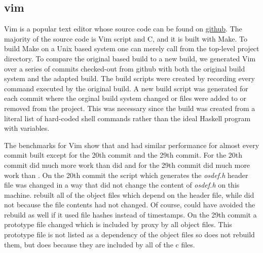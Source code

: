 \subsection{vim}
\label{sec:eval:vim}


Vim is a popular text editor whose source code can be found on \href{https://github.com/vim/vim}{github}.  The majority of the source code is Vim script and C, and it is built with Make.  To build Make on a Unix based system one can merely call \Make from the top-level project directory.  To compare the original \Make based build to a new \Rattle build, we generated Vim over a series of commits checked-out from github with both the original build system and the adapted \Rattle build.  The \Rattle build scripts were created by recording every command executed by the original build.
A new \Rattle build script was generated for each commit where the orginal build system changed or files were added to or removed from the project.  This was necessary since the \Rattle build was created from a literal list of hard-coded shell commands rather than the ideal Haskell program with variables.

The benchmarks for Vim show that \Make and \Rattle had similar performance for almost every commit built except for the 20th commit and the 29th commit.  For the 20th commit \Make did much more work than \Rattle did and for the 29th commit \Rattle did much more work than \Make.
On the 20th commit the script which generates the \emph{osdef.h} header file was changed in a way that did not change the content of \emph{osdef.h} on this machine.  \Make rebuilt all of the object files which depend on the header file, while \Rattle did not because the file contents had not changed.  Of course, \Make could have avoided the rebuild as well if it used file hashes instead of timestamps.  On the 29th commit a prototype file changed which is included by proxy by all object files.  This prototype file is not listed as a dependency of the object files so \Make does not rebuild them, but \Rattle does because they are included by all of the c files.

